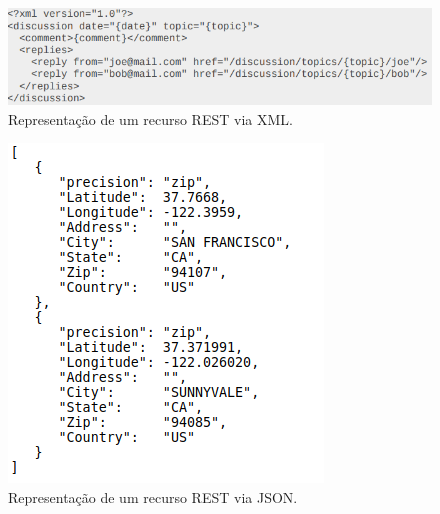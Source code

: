 \begin{figure}[htp]
	\caption{\label{xml_example}Representação de um recurso REST via XML.}
	\begin{center}
		\includegraphics[scale=0.9]{images/xml_example.png}
	\end{center}
\end{figure}

\begin{figure}[htp]
	\caption{\label{json}Representação de um recurso REST via JSON.}
	\begin{center}
		\includegraphics[scale=1]{images/json.png}
	\end{center}
\end{figure}

%
%
